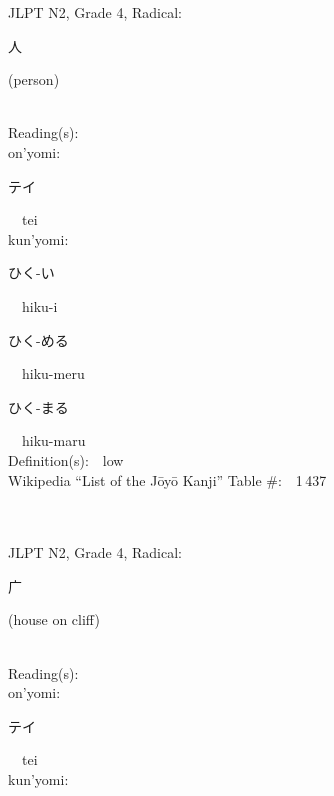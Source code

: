\begin{multicols}{2}
{JLPT N2, Grade 4, Radical:\ \ {\begin{CJK}{UTF8}{min} 人 \end{CJK}} (person) } \\
Reading(s):\ \ \\
{\hspace*{1em}}on'yomi:\ \ \\
{\hspace*{2em}}{\begin{CJK}{UTF8}{min} テイ \end{CJK}}\ \ tei\ \ \\
{\hspace*{1em}}kun'yomi:\ \ \\
{\hspace*{2em}}{\begin{CJK}{UTF8}{min} ひく-い \end{CJK}}\ \ hiku-i\ \ \\
{\hspace*{2em}}{\begin{CJK}{UTF8}{min} ひく-める \end{CJK}}\ \ hiku-meru\ \ \\
{\hspace*{2em}}{\begin{CJK}{UTF8}{min} ひく-まる \end{CJK}}\ \ hiku-maru\ \ \\
Definition(s):\ \ low \\
Wikipedia ``List of the J\=oy\=o Kanji'' Table \#:\ \ 1\,437 \\
\ \ \\
{\fontsize{34pt}{40pt}  }\ \ \\  %
{JLPT N2, Grade 4, Radical:\ \ {\begin{CJK}{UTF8}{min} 广 \end{CJK}} (house on cliff) } \\
Reading(s):\ \ \\
{\hspace*{1em}}on'yomi:\ \ \\
{\hspace*{2em}}{\begin{CJK}{UTF8}{min} テイ \end{CJK}}\ \ tei\ \ \\
{\hspace*{1em}}kun'yomi:\ \ \\

\end{multicols}
